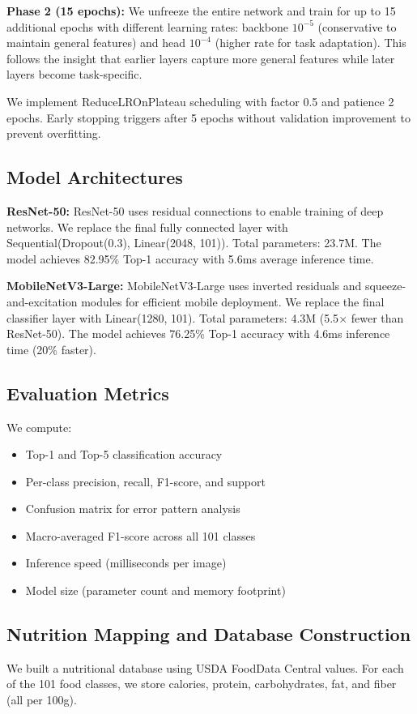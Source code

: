 \documentclass[conference]{IEEEtran}
\begin{document}
\textbf{Phase 2 (15 epochs):} We unfreeze the entire network and train for up to 15 additional epochs with different learning rates: backbone $10^{-5}$ (conservative to maintain general features) and head $10^{-4}$ (higher rate for task adaptation). This follows the insight that earlier layers capture more general features while later layers become task-specific.

We implement ReduceLROnPlateau scheduling with factor 0.5 and patience 2 epochs. Early stopping triggers after 5 epochs without validation improvement to prevent overfitting.

\subsection{Model Architectures}
\textbf{ResNet-50:} ResNet-50 \cite{he2016resnet} uses residual connections to enable training of deep networks. We replace the final fully connected layer with Sequential(Dropout(0.3), Linear(2048, 101)). Total parameters: 23.7M. The model achieves 82.95\% Top-1 accuracy with 5.6ms average inference time.

\textbf{MobileNetV3-Large:} MobileNetV3-Large \cite{howard2019mobilenetv3} uses inverted residuals and squeeze-and-excitation modules for efficient mobile deployment. We replace the final classifier layer with Linear(1280, 101). Total parameters: 4.3M (5.5$\times$ fewer than ResNet-50). The model achieves 76.25\% Top-1 accuracy with 4.6ms inference time (20\% faster).

\subsection{Evaluation Metrics}
We compute:
\begin{itemize}
    \item Top-1 and Top-5 classification accuracy
    \item Per-class precision, recall, F1-score, and support
    \item Confusion matrix for error pattern analysis
    \item Macro-averaged F1-score across all 101 classes
    \item Inference speed (milliseconds per image)
    \item Model size (parameter count and memory footprint)
\end{itemize}

\subsection{Nutrition Mapping and Database Construction}
We built a nutritional database using USDA FoodData Central values. For each of the 101 food classes, we store calories, protein, carbohydrates, fat, and fiber (all per 100g).
\end{document}
